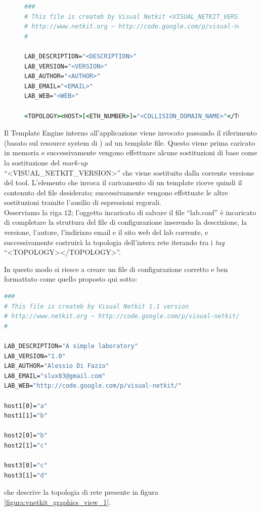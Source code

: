 \begin{figure}[!htb]
\begin{lstlisting}[language=csh]
###
# This file is createb by Visual Netkit <VISUAL_NETKIT_VERSION> version
# http://www.netkit.org ~ http://code.google.com/p/visual-netkit/
#

LAB_DESCRIPTION="<DESCRIPTION>"
LAB_VERSION="<VERSION>"
LAB_AUTHOR="<AUTHOR>"
LAB_EMAIL="<EMAIL>"
LAB_WEB="<WEB>"

<TOPOLOGY><HOST>[<ETH_NUMBER>]="<COLLISION_DOMAIN_NAME>"</TOPOLOGY>
\end{lstlisting}
\end{figure}
Il Template Engine interno all'applicazione viene invocato passando il riferimento (basato sul resource system di \qt{}) ad un template file. Questo viene prima caricato in memoria e successivamente vengono effettuare alcune sostituzioni di base come la sostituzione del \emph{mark-up}\\
``<VISUAL\_{}NETKIT\_{}VERSION>'' che viene sostituito dalla corrente versione del tool.
L'elemento che invoca il caricamento di un template riceve quindi il contenuto del file desiderato; successivamente vengono effettuate le altre sostituzioni tramite l'ausilio di espressioni regorali.\\
Osserviamo la riga $12$; l'oggetto incaricato di salvare il file ``lab.conf'' è incaricato di completare la struttura del file di configurazione inserendo la descrizione, la versione, l'autore, l'indirizzo email e il sito web del lab corrente, e successivamente costruirà la topologia dell'intera rete iterando tra i \emph{tag} ``<TOPOLOGY></TOPOLOGY>''.

In questo modo si riesce a creare un file di configurazione corretto e ben formattato come quello proposto qui sotto:

\begin{lstlisting}[language=csh]
###
# This file is createb by Visual Netkit 1.1 version
# http://www.netkit.org ~ http://code.google.com/p/visual-netkit/
#

LAB_DESCRIPTION="A simple laboratory"
LAB_VERSION="1.0"
LAB_AUTHOR="Alessio Di Fazio"
LAB_EMAIL="slux83@gmail.com"
LAB_WEB="http://code.google.com/p/visual-netkit/"

host1[0]="a"
host1[1]="b"

host2[0]="b"
host2[1]="c"

host3[0]="c"
host3[1]="d"
\end{lstlisting}
che descrive la topologia di rete presente in figura \ref{figura:vnetkit_graphics_view_1}.

